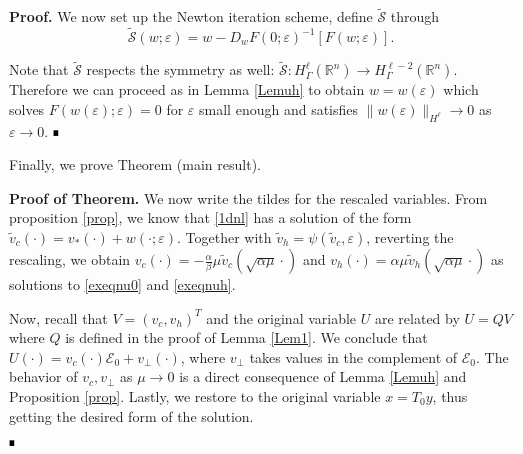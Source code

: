 \documentclass[letterpaper,11pt]{article}
\newcommand{\R}{\mathbb{R}}
\newcommand{\eps}{\varepsilon}
\newcommand{\cS}{\mathcal{S}}
\numberwithin{equation}{section}
\theoremstyle{plain}
\theoremstyle{remark}
\newenvironment{Proof}[1][.]%
 {\begin{trivlist}\item[]\textbf{Proof#1 }}%
 {\hspace*{\fill}$\rule{0.3\baselineskip}{0.35\baselineskip}$\end{trivlist}}
\begin{document}
\begin{Proof}
We now set up the Newton iteration scheme, define $\tilde{\cS}$ through
\[\tilde{\cS}(w;\eps) = w-D_wF(0;\eps)^{-1}[F(w;\eps)].\]

Note that $\tilde{\cS}$ respects the symmetry as well: $\tilde{\cS} : H^\ell_\Gamma(\R^n) \to H^{\ell-2}_\Gamma(\R^n)$. Therefore we can proceed as in Lemma \ref{Lemuh} to obtain $w=w(\eps)$ which solves $F(w(\eps);\eps) = 0$ for $\eps $ small enough and satisfies $\|w(\eps)\|_{H^\ell} \to 0$ as $\eps \to 0$.
\end{Proof}

Finally, we prove Theorem (main result).
\begin{Proof}[ of Theorem.] We now write the tildes for the rescaled variables. From proposition \ref{prop}, we know that \eqref{1dnl} has a solution of the form $\tilde{v}_c(\cdot) = v_*(\cdot)+w(\cdot;\eps)$. Together with $\tilde{v}_h = \psi(\tilde{v}_c,\eps)$, reverting the rescaling, we obtain $v_c(\cdot) = -\frac{\alpha}{\beta}\mu \tilde{v}_c(\sqrt{\alpha\mu }\cdot)$ and $v_h(\cdot) = \alpha\mu \tilde{v}_h(\sqrt{\alpha\mu}\cdot)$ as solutions to \eqref{exeqnu0} and \eqref{exeqnuh}.

 Now, recall that $V=(v_c,v_h)^T$ and the original variable $U$ are related by $U= QV$ where $Q$ is defined in the proof of Lemma \ref{Lem1}. We conclude that $U(\cdot)=v_c(\cdot)\mathcal{E}_0+v_{\perp}(\cdot)$, where $v_{\perp}$ takes values in the complement of $\mathcal{E}_0$. The behavior of $v_c,v_{\perp}$ as $\mu \to 0$ is a direct consequence of Lemma \ref{Lemuh} and Proposition \ref{prop}. Lastly, we restore to the original variable $x = T_0y$, thus getting the desired form of the solution.
 
 
\citep{Bates1997}
\end{Proof}



\end{document}
